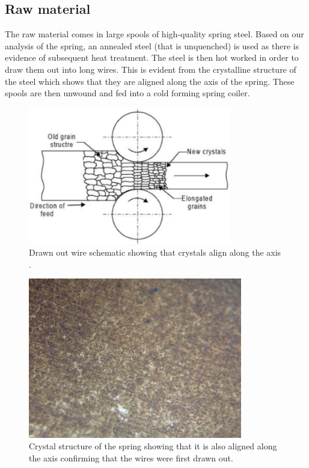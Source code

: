 \documentclass[11pt]{article}
\begin{document}
\subsection{Raw material}
The raw material comes in large spools of high-quality spring steel. Based on our analysis of the spring, an annealed steel (that is unquenched) is used as there is evidence of subsequent heat treatment. The steel is then hot worked in order to draw them out into long wires. This is evident from the crystalline structure of the steel which shows that they are aligned along the axis of the spring. These spools are then unwound and fed into a cold forming spring coiler.
\begin{figure}[H]
    \centering
    \includegraphics[height = 6cm]{./img/drawing1.png}
    \caption{Drawn out wire schematic showing that crystals align along the axis \cite{b4}.}
    \label{fig:drawing1}
\end{figure}
\begin{figure}[H]
    \centering
    \includegraphics[height = 7cm]{./img/microstructure2.jpeg}
    \caption{Crystal structure of the spring showing that it is also aligned along the axis confirming that the wires were first drawn out.}
    \label{fig:microstructure2}
\end{figure}
\end{document}
